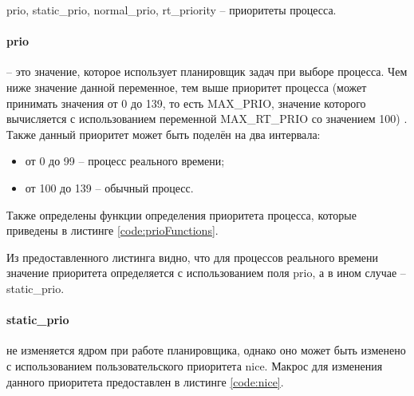 prio, static\_prio, normal\_prio, rt\_priority -- приоритеты процесса.

\paragraph*{prio} -- это значение, которое использует планировщик задач при выборе процесса. Чем ниже значение данной переменное, тем выше приоритет процесса (может принимать значения от 0 до 139, то есть MAX\_PRIO, значение которого вычисляется с использованием переменной MAX\_RT\_PRIO со значением 100) \cite{linuxPriority}. Также данный приоритет может быть поделён на два интервала:
\begin{itemize}[leftmargin=1.6\parindent]
\item от 0 до 99 -- процесс реального времени;
\item от 100 до 139 -- обычный процесс.
\end{itemize}

Также определены функции определения приоритета процесса, которые приведены в листинге \ref{code:prioFunctions}.


Из предоставленного листинга видно, что для процессов реального времени значение приоритета определяется с использованием поля prio, а в ином случае -- static\_prio.

\paragraph*{static\_prio} не изменяется ядром при работе планировщика, однако оно может быть изменено с использованием пользовательского приоритета nice. Макрос для изменения данного приоритета предоставлен в листинге \ref{code:nice}.


